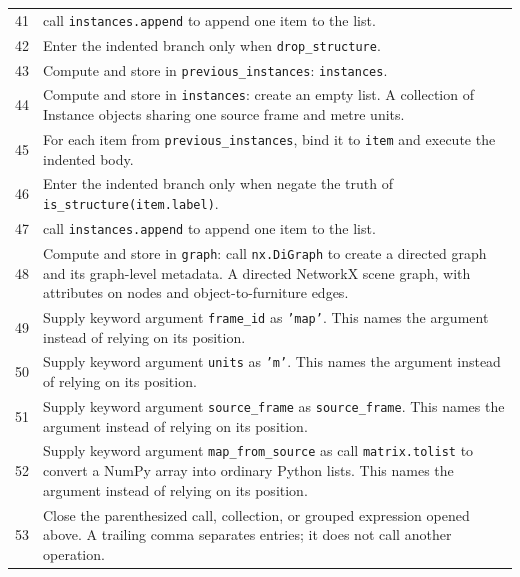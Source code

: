 \documentclass[11pt,a4paper]{book}
\begin{document}
\begin{longtable}{r p{}}
41 & call \texttt{instances.append} to append one item to the list. \\

42 & Enter the indented branch only when \texttt{drop\_structure}. \\

43 & Compute and store in \texttt{previous\_instances}: \texttt{instances}.  \\

44 & Compute and store in \texttt{instances}: create an empty list. A collection of Instance objects sharing one source frame and metre units. \\

45 & For each item from \texttt{previous\_instances}, bind it to \texttt{item} and execute the indented body. \\

46 & Enter the indented branch only when negate the truth of \texttt{is\_structure(item.label)}. \\

47 & call \texttt{instances.append} to append one item to the list. \\

48 & Compute and store in \texttt{graph}: call \texttt{nx.DiGraph} to create a directed graph and its graph-level metadata. A directed NetworkX scene graph, with attributes on nodes and object-to-furniture edges. \\

49 & Supply keyword argument \texttt{frame\_id} as \texttt{'map'}. This names the argument instead of relying on its position. \\

50 & Supply keyword argument \texttt{units} as \texttt{'m'}. This names the argument instead of relying on its position. \\

51 & Supply keyword argument \texttt{source\_frame} as \texttt{source\_frame}. This names the argument instead of relying on its position. \\

52 & Supply keyword argument \texttt{map\_from\_source} as call \texttt{matrix.tolist} to convert a NumPy array into ordinary Python lists. This names the argument instead of relying on its position. \\

53 & Close the parenthesized call, collection, or grouped expression opened above. A trailing comma separates entries; it does not call another operation. \\


\end{longtable}
\end{document}
